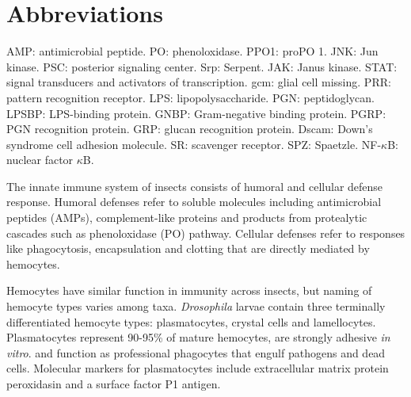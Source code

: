 \documentclass[11pt]{article}
\begin{document}
\begin{sloppypar}
\section{Abbreviations}
AMP: antimicrobial peptide.\newline
PO: phenoloxidase.\newline
PPO1: proPO 1.\newline
JNK: Jun kinase.\newline
PSC: posterior signaling center.\newline
Srp: Serpent.\newline
JAK: Janus kinase.\newline
STAT: signal transducers and activators of transcription.\newline
gcm: glial cell missing.\newline
PRR: pattern recognition receptor.\newline
LPS: lipopolysaccharide.\newline
PGN: peptidoglycan.\newline
LPSBP: LPS-binding protein.\newline
GNBP: Gram-negative binding protein.\newline
PGRP: PGN recognition protein.\newline
GRP: glucan recognition protein.\newline
Dscam: Down's syndrome cell adhesion molecule.\newline
SR: scavenger receptor.\newline
SPZ: Spaetzle.\newline
NF-$\kappa$B: nuclear factor $\kappa$B.
\par
The innate immune system of insects consists of humoral and cellular defense response. 
Humoral defenses refer to soluble molecules including antimicrobial peptides (AMPs), complement-like proteins and products from protealytic cascades such as phenoloxidase (PO) pathway. 
Cellular defenses refer to responses like phagocytosis, encapsulation and clotting that are directly mediated by hemocytes.
\par
Hemocytes have similar function in immunity across insects, but naming of hemocyte types varies among taxa. 
\textit{Drosophila} larvae contain three terminally differentiated hemocyte types: plasmatocytes, crystal cells and lamellocytes. 
Plasmatocytes represent 90-95\% of mature hemocytes, are strongly adhesive \textit{in vitro}. and function as professional phagocytes that engulf pathogens and dead cells. 
Molecular markers for plasmatocytes include extracellular matrix protein peroxidasin and a surface factor P1 antigen. 

\end{sloppypar}
\end{document}

